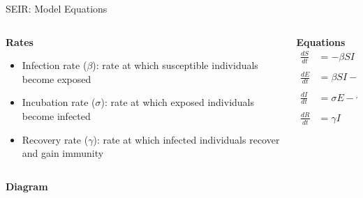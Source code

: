 \begin{frame}[t]{SEIR: Model Equations}
\small
\begin{columns}[t]
    \begin{column}{0.5\textwidth}
    \textbf{Rates}
     \begin{itemize}
        \item Infection rate ($\beta$): rate at which susceptible individuals become exposed
        \item Incubation rate ($\sigma$): rate at which exposed individuals become infected
        \item Recovery rate ($\gamma$): rate at which infected individuals recover and gain immunity
  \end{itemize}

    \end{column}
    \begin{column}{0.5\textwidth}
            \textbf{Equations}
    \begin{align*}
    \frac{dS}{dt} &= -\beta S I \\
    \\
    \frac{dE}{dt} &= \beta S I - \sigma E \\
    \\
    \frac{dI}{dt} &= \sigma E - \gamma I \\
    \\
    \frac{dR}{dt} &= \gamma I
  \end{align*}
    \end{column}
\end{columns}  
\vfill
\textbf{Diagram}

\begin{center}
    

\end{center}
\end{frame}







